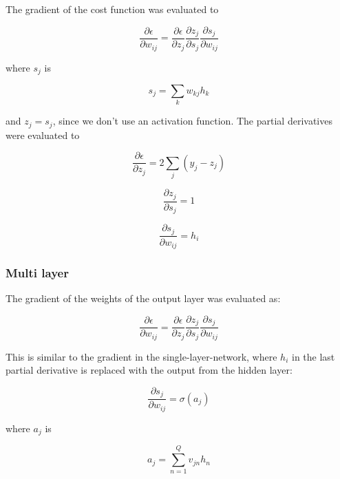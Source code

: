 \documentclass{article}
\begin{document}
The gradient of the cost function was evaluated to

\begin{equation}
  \frac{\partial \epsilon}{\partial w_{ij}} =
  \frac{\partial \epsilon}{\partial z_j}
  \frac{\partial z_j}{\partial s_j}
  \frac{\partial s_j}{\partial w_{ij}}
\end{equation}

where $s_j$ is

\begin{equation}
  s_j = \sum_{k}{w_{kj}h_k}
\end{equation}

and $z_j = s_j$, since we don't use an activation function.
The partial derivatives were evaluated to

\begin{equation}
    \frac{\partial \epsilon}{\partial z_j} = 2\sum_j(y_j - z_j)
\end{equation}

\begin{equation}
    \frac{\partial z_j}{\partial s_j} = 1
\end{equation}

\begin{equation}
    \frac{\partial s_j}{\partial w_{ij}} = h_i
\end{equation}

\subsubsection{Multi layer}

The gradient of the weights of the output layer was evaluated as:

\begin{equation}
  \frac{\partial \epsilon}{\partial w_{ij}} =
  \frac{\partial \epsilon}{\partial z_j}
  \frac{\partial z_j}{\partial s_j}
  \frac{\partial s_j}{\partial w_{ij}}
\end{equation}

This is similar to the gradient in the single-layer-network, where $h_i$
in the last partial derivative is replaced with the output from the hidden
layer:

\begin{equation}
    \frac{\partial s_j}{\partial w_{ij}} = \sigma(a_j)
\end{equation}

where $a_j$ is 

\begin{equation}
    a_j = \sum_{n=1}^Q v_{jn}h_n
\end{equation}
\end{document}
